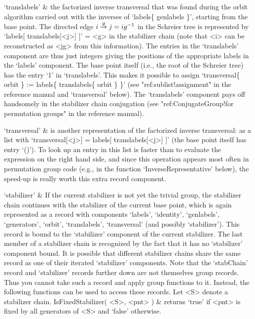 `translabels' &
        the factorized inverse   transversal  that was  found during  the
        orbit  algorithm  carried out   with the   inverses of  `labels\{
        genlabels \}', starting from the base point. The directed edge $i
        \labelto g j  = ig^{-1}$ in  the Schreier tree  is represented by
        `labels[ translabels[<j>] ]' = <g> in  the stabilizer chain (note
        that <i> can be reconstructed as <jg> from this information). The
        entries in the `translabels'   component are thus   just integers
        giving the  positions of the appropriate   labels in the `labels'
        component. The base point itself (i.e.,  the root of the Schreier
        tree) has the entry `1' in  `translabels'. This makes it possible
        to assign `transversal\{ orbit \} := labels\{ translabels\{ orbit
        \} \}' (see  "ref:sublist!assignment" in the reference manual and
        `transversal'  below).   The `translabels'   component   pays off
        handsomely   in    the   stabilizer    chain   conjugation   (see
        "ref:ConjugateGroup!for permutation      groups" in the reference
        manual).

`transversal' &
        is another  representation of the factorized inverse transversal:
        as a list   with `transversal[<j>] =  labels[ translabels[<j>] ]'
        (the base point  itself has entry `()').  To look up  an entry in
        this list is faster than to evaluate  the expression on the right
        hand side,  and   since this operation   appears  most  often  in
        permutation   group     code    (e.g.,    in      the    function
        `InverseRepresentative' below), the speed-up is really worth this
        extra record component.

`stabilizer' &
        If  the  current stabilizer is  not   yet the trivial  group, the
        stabilizer chain continues with   the stabilizer of  the  current
        base  point,  which is    again  represented as  a   record  with
        components `labels',    `identity',    `genlabels', `generators',
        `orbit',     `translabels',  `transversal'     (and      possibly
        `stabilizer'). This record is bound to the `stabilizer' component
        of the current stabilizer. The last member  of a stabilizer chain
        is recognized  by the fact that  it has no `stabilizer' component
        bound.
\enditems
It is possible that different stabilizer  chains share the same record as
one of their iterated `stabilizer' components.  Note that the `stabChain'
record and `stabilizer'  records further down   are not themselves  group
records. Thus you cannot take such a record and  apply group functions to
it. Instead, the following functions can be used to access these records.
Let <S> denote a stabilizer chain.
\beginitems
\function IsFixedStabilizer( <S>, <pnt> ) &
        returns `true'  if <pnt> is fixed by   all generators of  <S> and
        `false' otherwise.

